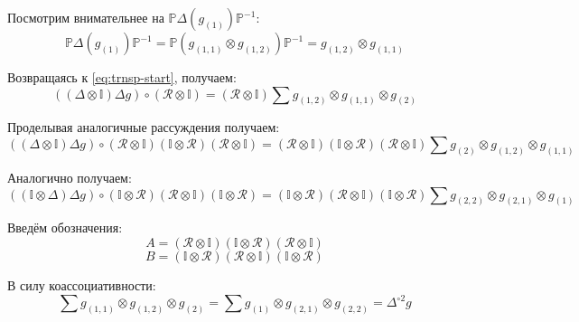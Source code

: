 \documentclass[12pt,a4paper]{article}
\begin{document}
Посмотрим внимательнее на $\mathbb{P} \Delta(g_{(1)})\mathbb{P}^{-1}$:
\begin{equation}
    \mathbb{P} \Delta(g_{(1)})\mathbb{P}^{-1} = \mathbb{P} (g_{(1,1)} \otimes g_{(1,2)})
    \mathbb{P}^{-1} = g_{(1,2)} \otimes g_{(1,1)}
\end{equation}

Возвращаясь к \eqref{eq:trnsp-start}, получаем:
\begin{equation}
    ((\Delta \otimes \mathbb{I})\Delta g) \circ (\mathcal{R} 
    \otimes \mathbb{I}) = (\mathcal{R} 
    \otimes \mathbb{I}) \sum g_{(1,2)} \otimes g_{(1,1)} \otimes g_{(2)}
\end{equation}

Проделывая аналогичные рассуждения получаем:
\begin{equation}
    ((\Delta \otimes \mathbb{I})\Delta g) \circ (\mathcal{R} 
    \otimes \mathbb{I})(\mathbb{I} \otimes \mathcal{R})
    (\mathcal{R} \otimes \mathbb{I}) = (\mathcal{R} 
    \otimes \mathbb{I})(\mathbb{I} \otimes \mathcal{R})
    (\mathcal{R} \otimes \mathbb{I}) \sum g_{(2)} \otimes g_{(1,2)} \otimes g_{(1,1)}
    \label{eq:YB-1}
\end{equation}

Аналогично получаем:
\begin{equation}
    ((\mathbb{I} \otimes \Delta)\Delta g) \circ (\mathbb{I} \otimes \mathcal{R})
    (\mathcal{R} \otimes \mathbb{I}) (\mathbb{I} \otimes \mathcal{R}) = 
    (\mathbb{I} \otimes \mathcal{R})
    (\mathcal{R} \otimes \mathbb{I}) (\mathbb{I} \otimes \mathcal{R}) 
    \sum g_{(2, 2)} \otimes g_{(2,1)} \otimes g_{(1)}
    \label{eq:YB-2}
\end{equation}

Введём обозначения:
\begin{equation}
    A = (\mathcal{R} 
    \otimes \mathbb{I})(\mathbb{I} \otimes \mathcal{R})
    (\mathcal{R} \otimes \mathbb{I})
\end{equation}
\begin{equation}
    B = (\mathbb{I} \otimes \mathcal{R})
    (\mathcal{R} \otimes \mathbb{I}) (\mathbb{I} \otimes \mathcal{R})
\end{equation}

В силу коассоциативности:
\begin{equation}
    \sum g_{(1, 1)} \otimes g_{(1,2)} \otimes g_{(2)} = 
    \sum g_{(1)} \otimes g_{(2,1)} \otimes g_{(2, 2)} =
    \Delta^{\circ 2} g
\end{equation}
\end{document}

